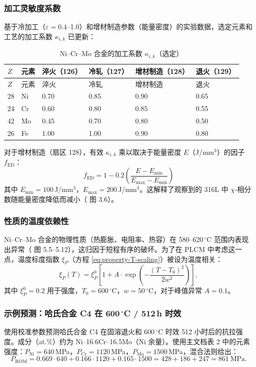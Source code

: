 \documentclass[12pt,a4paper]{article}
\begin{document}
	\subsubsection{加工灵敏度系数}
	基于冷加工（$\varepsilon=0.4$–1.0）和增材制造参数（能量密度）的实验数据，选定元素和工艺的加工系数 $\kappa_{i,k}$ 已更新：
	
	\begin{longtable}{p{1.5cm} p{1.2cm} p{1.8cm} p{1.8cm} p{1.8cm} p{1.8cm}}
		\caption{Ni–Cr–Mo 合金的加工系数 $\kappa_{i,k}$（选定）}\label{tab:nicrmo_kappa_ik}\\
		\toprule
		\(Z\) & 元素 & 淬火（126） & 冷轧（127） & 增材制造（128） & 退火（129） \\
		\midrule
		\endfirsthead
		\toprule
		\(Z\) & 元素 & 淬火 & 冷轧 & 增材制造 & 退火 \\
		\midrule
		\endhead
		28 & Ni & 0.70 & 0.85 & 0.90 & 0.65 \\
		24 & Cr & 0.60 & 0.80 & 0.85 & 0.55 \\
		42 & Mo & 0.45 & 0.70 & 0.80 & 0.50 \\
		26 & Fe & 1.00 & 1.00 & 0.90 & 0.80 \\
		\bottomrule
	\end{longtable}
	
	对于增材制造（扇区 128），有效 $\kappa_{i,k}$ 乘以取决于能量密度 $E$（J/mm\(^3\)）的因子 $f_{\text{ED}}$：
	\[
	f_{\text{ED}} = 1 - 0.2\left(\frac{E - E_{\text{min}}}{E_{\text{max}} - E_{\text{min}}}\right)
	\]
	其中 $E_{\text{min}}=100$\,J/mm\(^3\)，$E_{\text{max}}=200$\,J/mm\(^3\)。这解释了观察到的 316L 中 $\chi$-相分数随能量密度降低而减小（\cite{dis2025} 图 3.6）。
	
	\subsubsection{性质的温度依赖性}
	Ni–Cr–Mo 合金的物理性质（热膨胀、电阻率、热容）在 580–620\,\(^{\circ}\)C 范围内表现出异常（\cite{dis2025} 图 5.5–5.12），这归因于短程有序的破坏。为了在 PLCM 中考虑这一点，温度标度指数 $\xi_P$（方程 \ref{eq:property-T-scaling}）被设为温度相关：
	\[
	\xi_P(T) = \xi_P^0 \left[1 + A \cdot \exp\left(-\frac{(T-T_0)^2}{2w^2}\right)\right],
	\]
	其中 $\xi_P^0 = 0.2$ 用于强度，$T_0 = 600$\,\(^{\circ}\)C，$w = 50$\,\(^{\circ}\)C，对于峰值异常 $A = 0.1$。
	
	\subsubsection{示例预测：哈氏合金 C4 在 600\,\(^{\circ}\)C / 512\,h 时效}
	使用校准参数预测哈氏合金 C4 在固溶退火和 600\,\(^{\circ}\)C 时效 512 小时后的抗拉强度。成分（at.\%）约为 Ni–16.6Cr–16.5Mo（Ni 余量）。使用主文档表 2 中的元素强度：$P_{\text{Ni}}=640$\,MPa，$P_{\text{Cr}}=1120$\,MPa，$P_{\text{Mo}}=1500$\,MPa，混合法则给出：
	\[
	P_{\text{ROM}} = 0.669\cdot640 + 0.166\cdot1120 + 0.165\cdot1500 = 428 + 186 + 247 = 861\ \text{MPa}.
	\]
	
\end{document}
